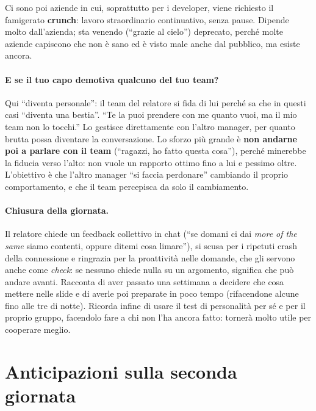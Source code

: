 Ci sono poi aziende in cui, soprattutto per i developer, viene richiesto il
famigerato \textbf{crunch}: lavoro straordinario continuativo, senza pause.
Dipende molto dall'azienda; sta venendo (``grazie al cielo'') deprecato, perché
molte aziende capiscono che non è sano ed è visto male anche dal pubblico, ma
esiste ancora.

\paragraph{E se il tuo capo demotiva qualcuno del tuo team?} Qui ``diventa
personale'': il team del relatore si fida di lui perché sa che in questi casi
``diventa una bestia''. ``Te la puoi prendere con me quanto vuoi, ma il mio
team non lo tocchi.'' Lo gestisce direttamente con l'altro manager, per quanto
brutta possa diventare la conversazione. Lo sforzo più grande è \textbf{non
andarne poi a parlare con il team} (``ragazzi, ho fatto questa cosa''), perché
minerebbe la fiducia verso l'alto: non vuole un rapporto ottimo fino a lui e
pessimo oltre. L'obiettivo è che l'altro manager ``si faccia perdonare''
cambiando il proprio comportamento, e che il team percepisca da solo il
cambiamento.

\paragraph{Chiusura della giornata.} Il relatore chiede un feedback collettivo
in chat (``se domani ci dai \emph{more of the same} siamo contenti, oppure
ditemi cosa limare''), si scusa per i ripetuti crash della connessione e
ringrazia per la proattività nelle domande, che gli servono anche come
\emph{check}: se nessuno chiede nulla su un argomento, significa che può
andare avanti. Racconta di aver passato una settimana a decidere che cosa
mettere nelle slide e di averle poi preparate in poco tempo (rifacendone
alcune fino alle tre di notte). Ricorda infine di usare il test di
personalità per sé e per il proprio gruppo, facendolo fare a chi non l'ha
ancora fatto: tornerà molto utile per cooperare meglio.

\section{Anticipazioni sulla seconda giornata}
\label{sec:z1-domani}

